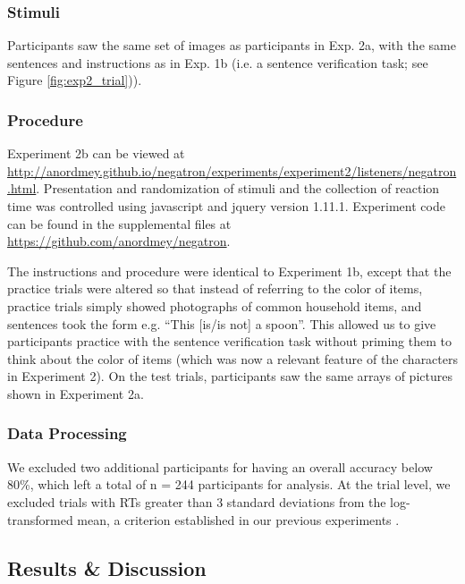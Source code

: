 \documentclass[man, floatsintext, noapacite]{apa6}
\begin{document}
\subsubsection{Stimuli}

Participants saw the same set of images as participants in Exp. 2a, with the same sentences and instructions as in Exp. 1b (i.e. a sentence verification task; see Figure \ref{fig:exp2_trial})).  

\subsubsection{Procedure}

Experiment 2b can be viewed at \url{http://anordmey.github.io/negatron/experiments/experiment2/listeners/negatron.html}. Presentation and randomization of stimuli and the collection of reaction time was controlled using javascript and jquery version 1.11.1. Experiment code can be found in the supplemental files at  \url{https://github.com/anordmey/negatron}.

The instructions and procedure were identical to Experiment 1b, except that the practice trials were altered so that instead of referring to the color of items, practice trials simply showed photographs of common household items, and sentences took the form e.g. ``This [is/is not] a spoon''. This allowed us to give participants practice with the sentence verification task without priming them to think about the color of items (which was now a relevant feature of the characters in Experiment 2). On the test trials, participants saw the same arrays of pictures shown in Experiment 2a. 

\subsubsection{Data Processing}

We excluded two additional participants for having an overall accuracy below 80\%, which left a total of n = 244 participants for analysis. At the trial level, we excluded trials with RTs greater than 3 standard deviations from the log-transformed mean, a criterion established in our previous experiments \cite{nordmeyer2014}. 

\subsection{Results \& Discussion}
\end{document}
